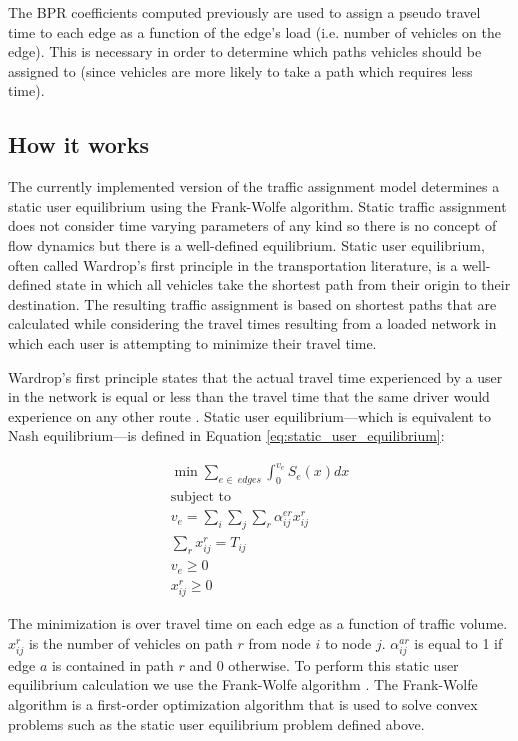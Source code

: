 The BPR coefficients computed previously are used to assign a pseudo travel time to each edge as a function of the edge's load (i.e. number of vehicles on the edge). This is necessary in order to determine which paths vehicles should be assigned to (since vehicles are more likely to take a path which requires less time).

\subsection{How it works}

The currently implemented version of the traffic assignment model determines a static user equilibrium using the Frank-Wolfe algorithm. Static traffic assignment does not consider time varying parameters of any kind so there is no concept of flow dynamics but there is a well-defined equilibrium. Static user equilibrium, often called Wardrop's first principle in the transportation literature, is a well-defined state in which all vehicles take the shortest path from their origin to their destination. The resulting traffic assignment is based on shortest paths that are calculated while considering the travel times resulting from a loaded network in which each user is attempting to minimize their travel time. 

Wardrop's first principle states that the actual travel time experienced by a user in the network is equal or less than the travel time that the same driver would experience on any other route \citep{wardrop1952road}. Static user equilibrium---which is equivalent to Nash equilibrium---is defined in Equation \ref{eq:static_user_equilibrium}:

\begin{equation}
    \label{eq:static_user_equilibrium}
    \begin{split}
    \min \sum_{e\in\ \textit{edges}}\int_{0}^{v_e} S_e(x) dx\\
    \text{subject to} \\ 
    v_e = \sum_i \sum_j \sum_r \alpha_{ij}^{er} x_{ij}^{r}\\
    \sum_r x_{ij}^{r} = T_{ij}\\
    v_e \geq 0 \\
    x_{ij}^{r} \geq 0
    \end{split}
\end{equation}

The minimization is over travel time on each edge as a function of traffic volume. $x_{ij}^{r}$ is the number of vehicles on path $r$ from node $i$ to node $j$. $\alpha_{ij}^{ar}$ is equal to 1 if edge $a$ is contained in path $r$ and 0 otherwise. To perform this static user equilibrium calculation we use the Frank-Wolfe algorithm \citep{frank1956algorithm}. The Frank-Wolfe algorithm is a first-order optimization algorithm that is used to solve convex problems such as the static user equilibrium problem defined above.



